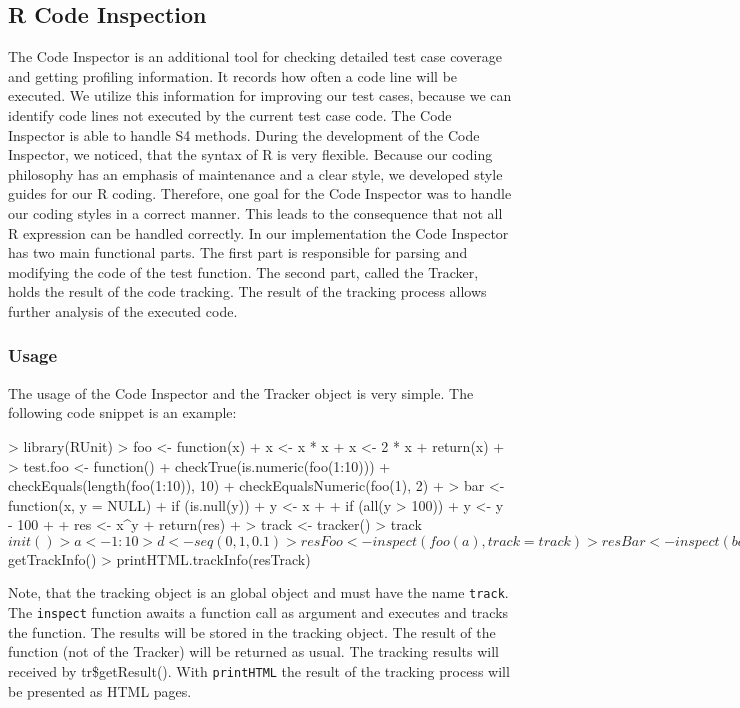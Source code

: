 \documentclass[12pt, a4paper]{article}
\begin{document}
\subsection{R Code Inspection}
\label{subsection:RCodeInspection}
The Code Inspector is an additional tool for checking detailed test case coverage and getting profiling information.
It records how often a code line will be executed. We utilize this information for improving our test cases, because we can identify code lines not executed by the current test case code.
The Code Inspector is able to handle S4 methods.
During the development of the Code Inspector, we noticed, that the syntax of R is very flexible.
Because our coding philosophy has an emphasis of maintenance and a clear style, we developed style guides for our R coding.
Therefore, one goal for the Code Inspector was to handle our coding styles in a correct manner.
This leads to the consequence that not all R expression can be handled correctly.
In our implementation the Code Inspector has two main functional parts.
The first part is responsible for parsing and modifying the code of the test function.
The second part, called the Tracker, holds the result of the code tracking.
The result of the tracking process allows further analysis of the executed code.

\subsubsection{Usage}
The usage of the Code Inspector and the Tracker object is very simple. The following code snippet is an example:
\begin{Schunk}
\begin{Sinput}
> library(RUnit)
> foo <- function(x) {
+     x <- x * x
+     x <- 2 * x
+     return(x)
+ }
> test.foo <- function() {
+     checkTrue(is.numeric(foo(1:10)))
+     checkEquals(length(foo(1:10)), 10)
+     checkEqualsNumeric(foo(1), 2)
+ }
> bar <- function(x, y = NULL) {
+     if (is.null(y)) {
+         y <- x
+     }
+     if (all(y > 100)) {
+         y <- y - 100
+     }
+     res <- x^y
+     return(res)
+ }
> track <- tracker()
> track$init()
> a <- 1:10
> d <- seq(0, 1, 0.1)
> resFoo <- inspect(foo(a), track = track)
> resBar <- inspect(bar(d), track = track)
> resTrack <- track$getTrackInfo()
> printHTML.trackInfo(resTrack)
\end{Sinput}
\end{Schunk}

Note, that the tracking object is an global object and must have the name {\tt track}.
The {\tt inspect} function awaits a function call as argument and executes and tracks the function.
The results will be stored in the tracking object.
The result of the function (not of the Tracker) will be returned as usual.
The tracking results will received by tr\$getResult().
With {\tt printHTML} the result of the tracking process will be presented as HTML pages.
\end{document}

